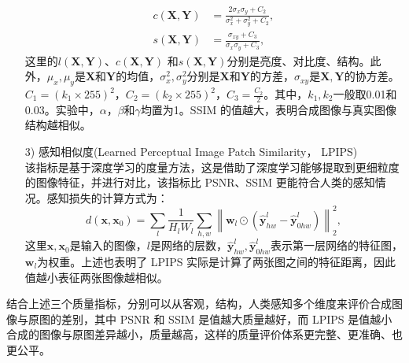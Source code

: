 \begin{enumerate}
\begin{align}
        c\left(\symbf{X}, \symbf{Y}\right) &= \frac{2\sigma_{x}\sigma_{y} + C_{2}}{\sigma_{x}^{2} + \sigma_{y}^{2} + C_{2}}, \\
        s\left(\symbf{X}, \symbf{Y}\right) &= \frac{\sigma_{xy} + C_{3}}{\sigma_{x}\sigma_{y} + C_{3}},
    \end{align}
    这里的$l\left(\symbf{X}, \symbf{Y}\right)$、$c\left(\symbf{X}, \symbf{Y}\right)$ 和$s\left(\symbf{X}, \symbf{Y}\right)$分别是亮度、对比度、结构。此外，$\mu_{x}, \mu_{y}$是$\symbf{X}$和$\symbf{Y}$的均值，$\sigma_{x}^2,\sigma_{y}^2$分别是$\symbf{X}$和$\symbf{Y}$的方差，$\sigma_{xy}$是$\symbf{X}, \symbf{Y}$的协方差。$C_{1} = \left(k_{1} \times 255\right)^{2}$，$C_{2} = \left(k_{2} \times 255\right)^{2}$，$C_3 = \frac{C_2}{2}$。其中，$k_1, k_2$一般取0.01和0.03。实验中，$\alpha$，$\beta$和$\gamma$均置为1。SSIM 的值越大，表明合成图像与真实图像结构越相似。\\
    \item [3)]感知相似度(Learned Perceptual Image Patch Similarity， LPIPS\cite{zhang2018unreasonable}) \\
    该指标是基于深度学习的度量方法，这是借助了深度学习能够提取到更细粒度的图像特征，并进行对比，该指标比 PSNR、SSIM 更能符合人类的感知情况。感知损失的计算方式为：
    \begin{equation}
        d\left(\symbf{x}, \symbf{x}_{0}\right) = \sum_{l}\frac{1}{H_{l}W_{l}}\sum_{h, w} \left\| \symbf{w}_{l}\odot \left(\hat{\symbf{y}}_{hw}^{l} - \hat{\symbf{y}}_{0hw}^{l}\right)\right\|_{2}^{2},
    \end{equation}
    这里$\symbf{x}, \symbf{x}_{0}$是输入的图像，$l$是网络的层数，$\hat{\symbf{y}}_{hw}^{l}, \hat{\symbf{y}}_{0hw}^{l}$表示第一层网络的特征图，$\symbf{w}_{l}$为权重。上述也表明了 LPIPS 实际是计算了两张图之间的特征距离，因此值越小表征两张图像越相似。\\
\end{enumerate}

结合上述三个质量指标，分别可以从客观，结构，人类感知多个维度来评价合成图像与原图的差别，其中 PSNR 和 SSIM 是值越大质量越好，而 LPIPS 是值越小合成的图像与原图差异越小，质量越高，这样的质量评价体系更完整、更准确、也更公平。


